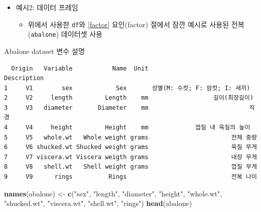 \documentclass[
  11pt,
]{krantz}
\makeatletter
\newenvironment{Shaded}{\begin{snugshade}}{\end{snugshade}}
\newcommand{\KeywordTok}[1]{\textcolor[rgb]{0.27,0.27,0.27}{\textbf{#1}}}
\newcommand{\NormalTok}[1]{#1}
\newcommand{\StringTok}[1]{\textcolor[rgb]{0.5,0.5,0.5}{#1}}
\providecommand{\tightlist}{%
  \setlength{\itemsep}{0pt}\setlength{\parskip}{0pt}}
\newenvironment{kframe}{%
\medskip{}
\setlength{\fboxsep}{.8em}
 \def\at@end@of@kframe{}%
 \ifinner\ifhmode%
  \def\at@end@of@kframe{\end{minipage}}%
  \begin{minipage}{\columnwidth}%
 \fi\fi%
 \def\FrameCommand##1{\hskip\@totalleftmargin \hskip-\fboxsep
 \colorbox{shadecolor}{##1}\hskip-\fboxsep
     \hskip-\linewidth \hskip-\@totalleftmargin \hskip\columnwidth}%
 \MakeFramed {\advance\hsize-\width
   \@totalleftmargin\z@ \linewidth\hsize
   \@setminipage}}%
 {\par\unskip\endMakeFramed%
 \at@end@of@kframe}
\newenvironment{rmdblock}[1]
  {
  \begin{itemize}
  \renewcommand{\labelitemi}{
    \raisebox{-.7\height}[0pt][0pt]{
      {\setkeys{Gin}{width=3em,keepaspectratio}\texttt{[image: images/\#1]}}
    }
  }
  \setlength{\fboxsep}{1em}
  \begin{kframe}
  \item
  }
  {
  \end{kframe}
  \end{itemize}
  }
\newenvironment{rmdnote}
  {\begin{rmdblock}{note}}
  {\end{rmdblock}}
\makeatother
\begin{document}
\normalsize

\begin{itemize}
\tightlist
\item
  예시2: 데이터 프레임

  \begin{itemize}
  \tightlist
  \item
    위에서 사용한 \texttt{df}와 \ref{factor} 요인(factor) 절에서 잠깐 예시로 사용된 전복(\texttt{abalone}) 데이터셋 사용
  \end{itemize}
\end{itemize}

\footnotesize

\begin{rmdnote}
\begin{rmdnote}

Abalone dataset 변수 설명

\end{rmdnote}
\end{rmdnote}

\normalsize

\footnotesize

\begin{verbatim}
  Origin   Variable           Name  Unit                     Description
1     V1        sex            Sex       성별(M: 수컷; F: 암컷; I: 새끼)
2     V2     length         Length    mm                  길이(최장길이)
3     V3   diameter       Diameter    mm                            직경
4     V4     height         Height    mm             껍질 내 육질의 높이
5     V5   whole.wt   Whole weight grams                       전체 중량
6     V6 shucked.wt Shucked weight grams                       육질 무게
7     V7 viscera.wt Viscera weigth grams                       내장 무게
8     V8   shell.wt   Shell weight grams                       껍질 무게
9     V9      rings          Rings                             전복 나이
\end{verbatim}

\normalsize

\footnotesize

\begin{Shaded}
\begin{Highlighting}[]
\KeywordTok{names}\NormalTok{(abalone) <-}\StringTok{ }\KeywordTok{c}\NormalTok{(}\StringTok{"sex"}\NormalTok{, }\StringTok{"length"}\NormalTok{, }\StringTok{"diameter"}\NormalTok{, }
                    \StringTok{"height"}\NormalTok{, }\StringTok{"whole.wt"}\NormalTok{, }
                    \StringTok{"shucked.wt"}\NormalTok{, }\StringTok{"viscera.wt"}\NormalTok{, }
                    \StringTok{"shell.wt"}\NormalTok{, }\StringTok{"rings"}\NormalTok{)}
\KeywordTok{head}\NormalTok{(abalone)}
\end{Highlighting}
\end{Shaded}
\end{document}
